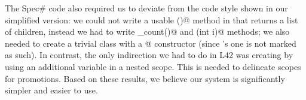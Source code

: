 





\noindent The Spec\# code also required us to deviate from the code style shown in our simplified version: we could not write a usable \Q@children()@ method in \Q@Widget@ that returns a list of children, instead we had to write \Q@children_count()@ and \Q@children(int i)@ methods; we also needed to create a trivial class with a \Q@[Pure]@ constructor (since \Q@Object@'s one is not marked as such). In contrast, the only indirection we had to do in L42 was creating \Q@Box@es by using 
an additional variable in a nested scope.
This is needed to delineate scopes for promotions.
Based on these results, we believe our system is significantly simpler and easier to use.


